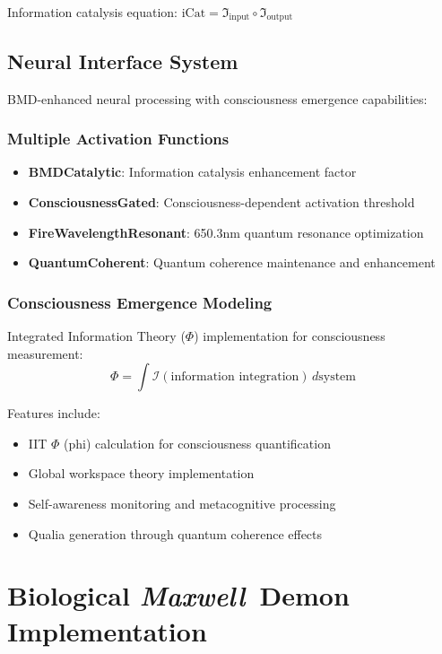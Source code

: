 \documentclass[11pt,a4paper]{article}
\newcommand{\maxwell}{\textit{Maxwell}}
\begin{document}
Information catalysis equation: $\text{iCat} = \mathfrak{I}_{\text{input}} \circ \mathfrak{I}_{\text{output}}$

\subsection{Neural Interface System}

BMD-enhanced neural processing with consciousness emergence capabilities:

\subsubsection{Multiple Activation Functions}

\begin{itemize}
\item \textbf{BMDCatalytic}: Information catalysis enhancement factor
\item \textbf{ConsciousnessGated}: Consciousness-dependent activation threshold
\item \textbf{FireWavelengthResonant}: 650.3nm quantum resonance optimization
\item \textbf{QuantumCoherent}: Quantum coherence maintenance and enhancement
\end{itemize}

\subsubsection{Consciousness Emergence Modeling}

Integrated Information Theory ($\Phi$) implementation for consciousness measurement:
\begin{equation}
\Phi = \int \mathcal{I}(\text{information integration}) \, d\text{system}
\end{equation}

Features include:
\begin{itemize}
\item IIT $\Phi$ (phi) calculation for consciousness quantification
\item Global workspace theory implementation
\item Self-awareness monitoring and metacognitive processing
\item Qualia generation through quantum coherence effects
\end{itemize}

\section{Biological \maxwell\ Demon Implementation}
\end{document}
